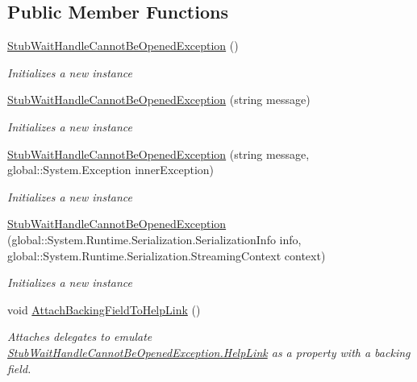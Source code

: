\subsection*{Public Member Functions}
\begin{DoxyCompactItemize}
\item 
\hyperlink{class_system_1_1_threading_1_1_fakes_1_1_stub_wait_handle_cannot_be_opened_exception_ae5fe34451108b3790ea8eb70b3a274ed}{Stub\-Wait\-Handle\-Cannot\-Be\-Opened\-Exception} ()
\begin{DoxyCompactList}\small\item\em Initializes a new instance\end{DoxyCompactList}\item 
\hyperlink{class_system_1_1_threading_1_1_fakes_1_1_stub_wait_handle_cannot_be_opened_exception_a2050d248f228451e5986fbcbbcec5e96}{Stub\-Wait\-Handle\-Cannot\-Be\-Opened\-Exception} (string message)
\begin{DoxyCompactList}\small\item\em Initializes a new instance\end{DoxyCompactList}\item 
\hyperlink{class_system_1_1_threading_1_1_fakes_1_1_stub_wait_handle_cannot_be_opened_exception_af93361c58945f41cbc412d19aa1a5515}{Stub\-Wait\-Handle\-Cannot\-Be\-Opened\-Exception} (string message, global\-::\-System.\-Exception inner\-Exception)
\begin{DoxyCompactList}\small\item\em Initializes a new instance\end{DoxyCompactList}\item 
\hyperlink{class_system_1_1_threading_1_1_fakes_1_1_stub_wait_handle_cannot_be_opened_exception_a4ef11ba1524ce297be9c338d26f28997}{Stub\-Wait\-Handle\-Cannot\-Be\-Opened\-Exception} (global\-::\-System.\-Runtime.\-Serialization.\-Serialization\-Info info, global\-::\-System.\-Runtime.\-Serialization.\-Streaming\-Context context)
\begin{DoxyCompactList}\small\item\em Initializes a new instance\end{DoxyCompactList}\item 
void \hyperlink{class_system_1_1_threading_1_1_fakes_1_1_stub_wait_handle_cannot_be_opened_exception_aea717f878ace7e1292f658d19b19e680}{Attach\-Backing\-Field\-To\-Help\-Link} ()
\begin{DoxyCompactList}\small\item\em Attaches delegates to emulate \hyperlink{class_system_1_1_threading_1_1_fakes_1_1_stub_wait_handle_cannot_be_opened_exception_a4e1886f4ab3e65b7fa743aa330202cb7}{Stub\-Wait\-Handle\-Cannot\-Be\-Opened\-Exception.\-Help\-Link} as a property with a backing field.\end{DoxyCompactList}\item 

\end{DoxyCompactItemize}
